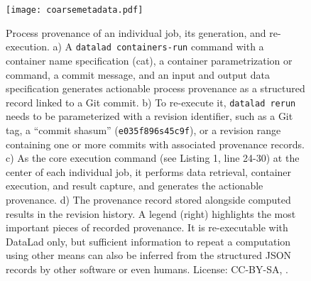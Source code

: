\begin{figure}
	\centering
	\texttt{[image: coarsemetadata.pdf]}
	\caption[FAIRly big: Process provenance of an individual job]{Process provenance of an individual job, its generation, and re-execution. a) A \texttt{datalad containers-run} command with a container name specification (cat), a container parametrization or command, a commit message, and an input and output data specification generates actionable process provenance as a structured record linked to a Git commit. b) To re-execute it, \texttt{datalad rerun} needs to be parameterized with a revision identifier, such as a Git tag, a ``commit shasum'' (\texttt{e035f896s45c9f}), or a revision range containing one or more commits with associated provenance records. c) As the core execution command (see Listing 1, line 24-30) at the center of each individual job, it performs data retrieval, container execution, and result capture, and generates the actionable provenance. d) The provenance record stored alongside computed results in the revision history. A legend (right) highlights the most important pieces of recorded provenance. It is re-executable with DataLad only, but sufficient information to repeat a computation using other means can also be inferred from the structured JSON records by other software or even humans. License: CC-BY-SA, \citet{wagner2022fairly}.}
	\label{fig:fairly_metadata}
\end{figure}


